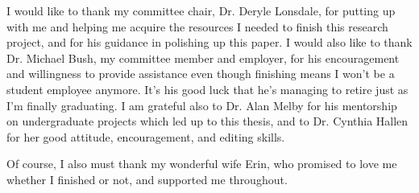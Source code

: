 I would like to thank my committee chair, Dr. Deryle Lonsdale, for putting up with me and helping me acquire the resources I needed to finish this research project, and for his guidance in polishing up this paper. I would also like to thank Dr. Michael Bush, my committee member and employer, for his encouragement and willingness to provide assistance even though finishing means I won't be a student employee anymore. It's his good luck that he's managing to retire just as I'm finally graduating. I am grateful also to Dr. Alan Melby for his mentorship on undergraduate projects which led up to this thesis, and to Dr. Cynthia Hallen for her good attitude, encouragement, and editing skills.

Of course, I also must thank my wonderful wife Erin, who promised to love me whether I finished or not, and supported me throughout.